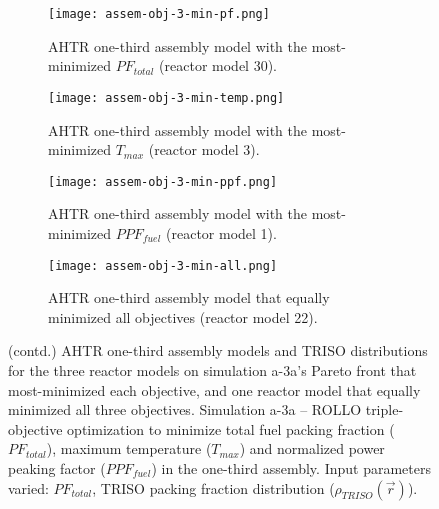 \begin{figure}[htbp!]
    \ContinuedFloat
    \begin{subfigure}{0.49\textwidth}
        \centering
        \texttt{[image: assem-obj-3-min-pf.png]}
        \caption{\gls{AHTR} one-third assembly model with the most-minimized $PF_{total}$ 
        (reactor model 30).}
        \label{fig:assem-obj-3-min-pf} 
    \end{subfigure}
    \begin{subfigure}{0.49\textwidth}
        \centering
        \texttt{[image: assem-obj-3-min-temp.png]}
        \caption{\gls{AHTR} one-third assembly model with the most-minimized $T_{max}$
        (reactor model 3).}
        \label{fig:assem-obj-3-min-temp} 
    \end{subfigure}
    \begin{subfigure}{0.49\textwidth}
        \centering
        \texttt{[image: assem-obj-3-min-ppf.png]}
        \caption{\gls{AHTR} one-third assembly model with the most-minimized $PPF_{fuel}$
        (reactor model 1).}
        \label{fig:assem-obj-3-min-ppf} 
    \end{subfigure}
    \begin{subfigure}{0.49\textwidth}
        \centering
        \texttt{[image: assem-obj-3-min-all.png]}
        \caption{\gls{AHTR} one-third assembly model that equally minimized all objectives
        (reactor model 22).}
        \label{fig:assem-obj-3-min-all} 
    \end{subfigure}
    \begin{subfigure}{.4\textwidth}
    \vspace{1cm}
    \centering
\end{subfigure}
    \caption{(contd.) AHTR one-third assembly models and TRISO distributions for the 
    three reactor models on simulation a-3a's Pareto front that most-minimized each 
    objective, and one reactor model that equally minimized all three objectives.
    Simulation a-3a -- ROLLO triple-objective optimization to minimize total fuel packing 
    fraction ($PF_{total}$), maximum temperature ($T_{max}$) and 
    normalized power peaking factor ($PPF_{fuel}$) in the one-third assembly. 
    Input parameters varied: $PF_{total}$, TRISO packing fraction distribution
    ($\rho_{TRISO}(\vec{r})$).}
\end{figure}

